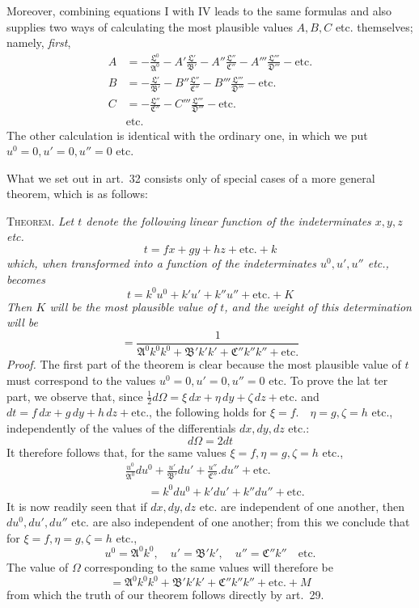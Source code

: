 Moreover, combining equations I with IV leads to the same formulas and also supplies two ways of calculating the most plausible values \(A,B,C\) etc. themselves; namely, \textit{first},
\[
\begin{aligned}
A&=-\frac{\mathfrak{L}^0}{\mathfrak{A}^0}-A'\frac{\mathfrak{L}'}{\mathfrak{B}'}-A''\frac{\mathfrak{L}''}{\mathfrak{C}''}-A'''\frac{\mathfrak{L}'''}{\mathfrak{D}'''}-\text{etc.}\\[4pt]
B&=-\frac{\mathfrak{L}'}{\mathfrak{B}'}-B''\frac{\mathfrak{L}''}{\mathfrak{C}''}-B'''\frac{\mathfrak{L}'''}{\mathfrak{D}'''}-\text{etc.}\\[4pt]
C&=-\frac{\mathfrak{L}''}{\mathfrak{C}''}-C'''\frac{\mathfrak{L}'''}{\mathfrak{D}'''}-\text{etc.}\\
&\text{etc.}
\end{aligned}
\]
The other calculation is identical with the ordinary one, in which we put \(u^0=0,\allowbreak u'=0,\allowbreak u''=0\) etc.

What we set out in art.\ 32 consists only of special cases of a more general theorem, which is as follows:

\textsc{Theorem.} \textit{Let \(t\) denote the following linear function of the indeterminates \(x,y,z\) etc.}
\[
t=fx+gy+hz+\text{etc.}+k
\]
\textit{which, when transformed into a function of the indeterminates \(u^0,u',u''\) etc., becomes}
\[
t=k^0u^0+k'u'+k''u''+\text{etc.}+K
\]
\textit{Then \(K\) will be the most plausible value of \(t\), and the weight of this determination will be}
\[
=\frac1{\mathfrak{A}^0k^0k^0+\mathfrak{B}'k'k'+\mathfrak{C}''k''k''+\text{etc.}}
\]
\textit{Proof.} The first part of the theorem is clear because the most plausible value of \(t\) must correspond to the values \(u^0=0,\allowbreak u'=0,\allowbreak u''=0\) etc. To prove the lat%
ter part, we observe that, since \(\tfrac12d\Omega=\xi\,dx+\eta\,dy+\zeta\,dz+\text{etc.}\) and \(dt=f\,dx+g\,dy+h\,dz+\text{etc.}\), the following holds for \(\xi=f.\quad\eta=g,\allowbreak\zeta=h\) etc., independently of the values of the differentials \(dx,dy,dz\) etc.:
\[
d\Omega=2dt
\]
It therefore follows that, for the same values \(\xi=f,\allowbreak\eta=g,\allowbreak\zeta=h\) etc.,
\[
\begin{aligned}
&\frac{u^0}{\mathfrak{A}^0}du^0+\frac{u'}{\mathfrak{B}'}du'+\frac{u''}{\mathfrak{C}''}.du''+\text{etc.}\\
&\qquad=k^0du^0+k'du'+k''du''+\text{etc.}
\end{aligned}
\]
It is now readily seen that if \(dx,dy,dz\) etc. are independent of one another, then \(du^0,du',du''\) etc. are also independent of one another; from this we conclude that for \(\xi=f,\allowbreak\eta=g,\allowbreak\zeta=h\) etc.,
\[
u^0=\mathfrak{A}^0k^0,\quad u'=\mathfrak{B}'k',\quad u''=\mathfrak{C}''k''\quad\text{etc.}
\]
The value of \(\Omega\) corresponding to the same values will therefore be
\[
=\mathfrak{A}^0k^0k^0+\mathfrak{B}'k'k'+\mathfrak{C}''k''k''+\text{etc.}+M
\]
from which the truth of our theorem follows directly by art.\ 29.

